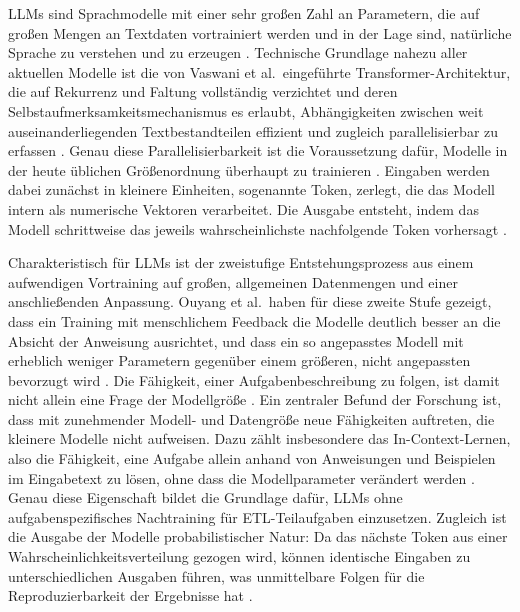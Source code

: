 \acp{LLM} sind Sprachmodelle mit einer sehr großen Zahl an Parametern, die auf großen Mengen an Textdaten vortrainiert werden und in der Lage sind, natürliche Sprache zu verstehen und zu erzeugen \autocite{zhaoSurveyLargeLanguage2026,liangSurveyMultimodelLarge2024}. Technische Grundlage nahezu aller aktuellen Modelle ist die von Vaswani et al.\ eingeführte Transformer-Architektur, die auf Rekurrenz und Faltung vollständig verzichtet und deren Selbstaufmerksamkeitsmechanismus es erlaubt, Abhängigkeiten zwischen weit auseinanderliegenden Textbestandteilen effizient und zugleich parallelisierbar zu erfassen \autocite{vaswaniAttentionAllYouNeed2017}. Genau diese Parallelisierbarkeit ist die Voraussetzung dafür, Modelle in der heute üblichen Größenordnung überhaupt zu trainieren \autocite{zhaoSurveyLargeLanguage2026,liangSurveyMultimodelLarge2024}. Eingaben werden dabei zunächst in kleinere Einheiten, sogenannte Token, zerlegt, die das Modell intern als numerische Vektoren verarbeitet. Die Ausgabe entsteht, indem das Modell schrittweise das jeweils wahrscheinlichste nachfolgende Token vorhersagt \autocite{zhaoSurveyLargeLanguage2026}.

Charakteristisch für \acp{LLM} ist der zweistufige Entstehungsprozess aus einem aufwendigen Vortraining auf großen, allgemeinen Datenmengen und einer anschließenden Anpassung. Ouyang et al.\ haben für diese zweite Stufe gezeigt, dass ein Training mit menschlichem Feedback die Modelle deutlich besser an die Absicht der Anweisung ausrichtet, und dass ein so angepasstes Modell mit erheblich weniger Parametern gegenüber einem größeren, nicht angepassten bevorzugt wird \autocite{ouyangTrainingLanguageModels2022}. Die Fähigkeit, einer Aufgabenbeschreibung zu folgen, ist damit nicht allein eine Frage der Modellgröße \autocite{zhaoSurveyLargeLanguage2026}. Ein zentraler Befund der Forschung ist, dass mit zunehmender Modell- und Datengröße neue Fähigkeiten auftreten, die kleinere Modelle nicht aufweisen. Dazu zählt insbesondere das In-Context-Lernen, also die Fähigkeit, eine Aufgabe allein anhand von Anweisungen und Beispielen im Eingabetext zu lösen, ohne dass die Modellparameter verändert werden \autocite{zhaoSurveyLargeLanguage2026,liuPretrainPromptPredict2023}. Genau diese Eigenschaft bildet die Grundlage dafür, \acp{LLM} ohne aufgabenspezifisches Nachtraining für \ac{ETL}-Teilaufgaben einzusetzen. Zugleich ist die Ausgabe der Modelle probabilistischer Natur: Da das nächste Token aus einer Wahrscheinlichkeitsverteilung gezogen wird, können identische Eingaben zu unterschiedlichen Ausgaben führen, was unmittelbare Folgen für die Reproduzierbarkeit der Ergebnisse hat \autocite{zhaoSurveyLargeLanguage2026}.

